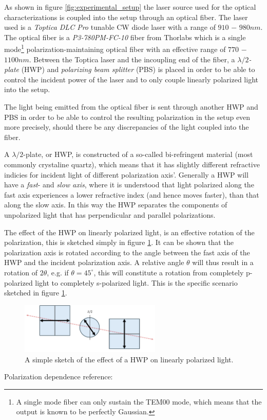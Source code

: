As shown in figure \ref{fig:experimental_setup} the laser source used for the optical characterizations is coupled into the setup through an optical fiber. The laser used is a \emph{Toptica DLC Pro} tunable CW diode laser with a range of $910$ $-$ $980nm$. The optical fiber is a \emph{P3-780PM-FC-10} fiber from Thorlabs which is a single mode\footnote{A single mode fiber can only sustain the TEM00 mode, which means that the output is known to be perfectly Gaussian.} polarization-maintaining optical fiber with an effective range of $770$ $-$ $1100nm$. Between the Toptica laser and the incoupling end of the fiber, a $\lambda/2$\emph{-plate} (HWP) and \emph{polarizing beam splitter} (PBS) is placed in order to be able to control the incident power of the laser and to only couple linearly polarized light into the setup. 

The light being emitted from the optical fiber is sent through another HWP and PBS in order to be able to control the resulting polarization in the setup even more precisely, should there be any discrepancies of the light coupled into the fiber. 

A $\lambda/2$-plate, or HWP, is constructed of a so-called bi-refringent material (most commonly crystaline quartz), which means that it has slightly different refractive indicies for incident light of different polarization axis'. Generally a HWP will have a \emph{fast}- and \emph{slow axis}, where it is understood that light polarized along the fast axis experiences a lower refractive index (and hence moves faster), than that along the slow axis. In this way the HWP separates the components of unpolarized light that has perpendicular and parallel polarizations. 

The effect of the HWP on linearly polarized light, is an effective rotation of the polarization, this is sketched simply in figure \ref{fig:HWP}. It can be shown that the polarization axis is rotated according to the angle between the fast axis of the HWP and the incident polarization axis. A relative angle $\theta$ will thus result in a rotation of $2\theta$, e.g. if $\theta=45^{\circ}$, this will constitute a rotation from completely p-polarized light to completely s-polarized light. This is the specific scenario sketched in figure \ref{fig:HWP}\cite{edmund_optics}.

\begin{figure}
    \centering
    \includegraphics[width=0.6\textwidth]{figures/HWP.pdf}
    \caption{A simple sketch of the effect of a HWP on linearly polarized light.}
    \label{fig:HWP}
\end{figure}



Polarization dependence reference: \cite{Ko}